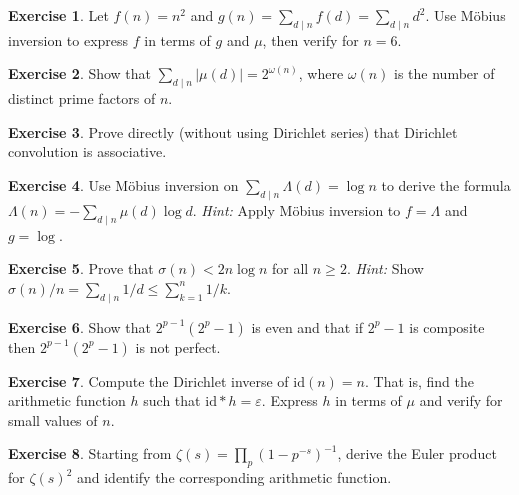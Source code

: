 \documentclass[12pt,a4paper,openany]{book}
\theoremstyle{definition}
\newtheorem{exercise}{Exercise}[chapter]
\theoremstyle{plain}
\theoremstyle{remark}
\newcommand{\abs}[1]{\left|#1\right|}
\begin{document}
\begin{exercise}\label{exer:mobius-inversion-apply}
Let $f(n) = n^2$ and $g(n) = \sum_{d\mid n}f(d) = \sum_{d\mid n}d^2$.
Use M\"obius inversion to express $f$ in terms of $g$ and $\mu$, then
verify for $n = 6$.
\end{exercise}

\begin{exercise}\label{exer:mu-squared-sum}
Show that $\sum_{d\mid n}\abs{\mu(d)} = 2^{\omega(n)}$, where $\omega(n)$
is the number of distinct prime factors of $n$.
\end{exercise}

\begin{exercise}\label{exer:conv-associativity}
Prove directly (without using Dirichlet series) that Dirichlet convolution
is associative.
\end{exercise}

\begin{exercise}\label{exer:mangoldt-inversion}
Use M\"obius inversion on $\sum_{d\mid n}\Lambda(d) = \log n$ to derive the
formula $\Lambda(n) = -\sum_{d\mid n}\mu(d)\log d$.
\textit{Hint:} Apply M\"obius inversion to $f = \Lambda$ and $g = \log$.
\end{exercise}

\begin{exercise}\label{exer:sigma-bound}
Prove that $\sigma(n) < 2n\log n$ for all $n \ge 2$.
\textit{Hint:} Show $\sigma(n)/n = \sum_{d\mid n}1/d \le \sum_{k=1}^{n}1/k$.
\end{exercise}

\begin{exercise}\label{exer:perfect-number-form}
Show that $2^{p-1}(2^p-1)$ is even and that if $2^p - 1$ is composite then
$2^{p-1}(2^p-1)$ is not perfect.
\end{exercise}

\begin{exercise}\label{exer:dirichlet-inverse-mu}
Compute the Dirichlet inverse of $\mathrm{id}(n) = n$.  That is, find the
arithmetic function $h$ such that $\mathrm{id} \ast h = \varepsilon$.
Express $h$ in terms of $\mu$ and verify for small values of $n$.
\end{exercise}

\begin{exercise}\label{exer:euler-product-derive}
Starting from $\zeta(s) = \prod_p(1-p^{-s})^{-1}$, derive the Euler product
for $\zeta(s)^2$ and identify the corresponding arithmetic function.
\end{exercise}
\end{document}
